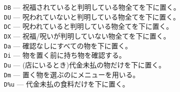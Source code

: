 {\tt DB}  --- 祝福されていると判明している物全てを下に置く。\\
{\tt DU}  --- 呪われていないと判明している物全てを下に置く。\\
{\tt DC}  --- 呪われていると判明している物全てを下に置く。\\
{\tt DX}  --- 祝福/呪いが判明していない物全てを下に置く。\\
{\tt Da}  --- 確認なしにすべての物を下に置く。\\
{\tt Di}  --- 物を置く前に持ち物を確認する。\\
{\tt Du}  --- (店にいるとき)代金未払の物だけを下に置く。\\
{\tt Dm}  --- 置く物を選ぶのにメニューを用いる。\\
{\tt D\%u} --- 代金未払の食料だけを下に置く。

